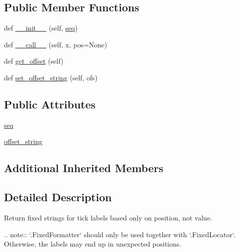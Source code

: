 \subsection*{Public Member Functions}
\begin{DoxyCompactItemize}
\item 
def \hyperlink{classmatplotlib_1_1ticker_1_1FixedFormatter_a1239d8bb2a79e2df7ccb57a43a06c754}{\+\_\+\+\_\+init\+\_\+\+\_\+} (self, \hyperlink{classmatplotlib_1_1ticker_1_1FixedFormatter_a9d84c4cba6efcea9477feab1161103cd}{seq})
\item 
def \hyperlink{classmatplotlib_1_1ticker_1_1FixedFormatter_aaec78a7c893b47ae9c18039aba98a9bb}{\+\_\+\+\_\+call\+\_\+\+\_\+} (self, x, pos=None)
\item 
def \hyperlink{classmatplotlib_1_1ticker_1_1FixedFormatter_a7aedd3f688c8f04c19eab8097a7aa7d6}{get\+\_\+offset} (self)
\item 
def \hyperlink{classmatplotlib_1_1ticker_1_1FixedFormatter_a3b54557a9c8656415e8e1561b4c5e9de}{set\+\_\+offset\+\_\+string} (self, ofs)
\end{DoxyCompactItemize}
\subsection*{Public Attributes}
\begin{DoxyCompactItemize}
\item 
\hyperlink{classmatplotlib_1_1ticker_1_1FixedFormatter_a9d84c4cba6efcea9477feab1161103cd}{seq}
\item 
\hyperlink{classmatplotlib_1_1ticker_1_1FixedFormatter_a67761d51e6f7fe844db57e1820a2395d}{offset\+\_\+string}
\end{DoxyCompactItemize}
\subsection*{Additional Inherited Members}


\subsection{Detailed Description}
\begin{DoxyVerb}Return fixed strings for tick labels based only on position, not value.

.. note::
    `.FixedFormatter` should only be used together with `.FixedLocator`.
    Otherwise, the labels may end up in unexpected positions.
\end{DoxyVerb}
 

